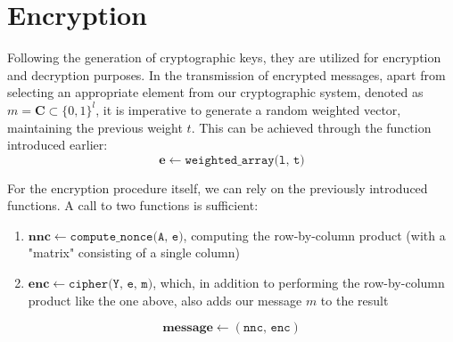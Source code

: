 \section{Encryption}

Following the generation of cryptographic keys, they are utilized for encryption and decryption purposes. In the transmission of encrypted messages, apart from selecting an appropriate element from our cryptographic system, denoted as $m = \mathbf{C} \subset \{0,1\}^l $, it is imperative to generate a random weighted vector, maintaining the previous weight $t$. This can be achieved through the function introduced earlier:
$$
\mathbf{e}\leftarrow\texttt{weighted\_array(l, t)}
$$

For the encryption procedure itself, we can rely on the previously introduced functions. A call to two functions is sufficient:
\begin{enumerate}
    \item $\mathbf{nnc} \leftarrow\texttt{compute\_nonce(A, e)}$, computing the row-by-column product (with a "matrix" consisting of a single column)
    \item $\mathbf{enc} \leftarrow\texttt{cipher(Y, e, m)}$, which, in addition to performing the row-by-column product like the one above, also adds our message $m$ to the result
\end{enumerate}
$$
\mathbf{message} \leftarrow(\texttt{nnc, enc})
$$